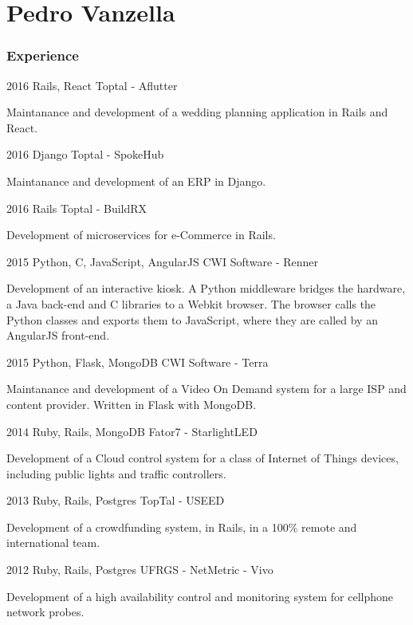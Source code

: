 \documentclass{tccv}
\begin{document}
\part{Pedro Vanzella}

\section{Experience}

\begin{eventlist}

\item{2016}
  {Rails, React}
  {Toptal - Aflutter}

Maintanance and development of a wedding planning application in Rails and
React.

\item{2016}
  {Django}
  {Toptal - SpokeHub}

Maintanance and development of an ERP in Django.

\item{2016}
  {Rails}
  {Toptal - BuildRX}

Development of microservices for e-Commerce in Rails.

\item{2015}
     {Python, C, JavaScript, AngularJS}
     {CWI Software - Renner}
     
Development of an interactive kiosk. A Python middleware bridges the hardware, a
Java back-end and C libraries to a Webkit browser. The browser calls the Python
classes and exports them to JavaScript, where they are called by an AngularJS front-end.

\item{2015}
     {Python, Flask, MongoDB}
     {CWI Software - Terra}

Maintanance and development of a Video On Demand system for a large ISP and
content provider. Written in Flask with MongoDB.

\item{2014}
     {Ruby, Rails, MongoDB}
     {Fator7 - StarlightLED}

Development of a Cloud control system for a class of Internet of Things devices,
including public lights and traffic controllers.

\item{2013}
     {Ruby, Rails, Postgres}
     {TopTal - USEED}

Development of a crowdfunding system, in Rails, in a 100\% remote and
international team.

\item{2012}
     {Ruby, Rails, Postgres}
     {UFRGS - NetMetric - Vivo}
 
Development of a high availability control and monitoring system for cellphone
network probes.

\end{eventlist}
\end{document}
